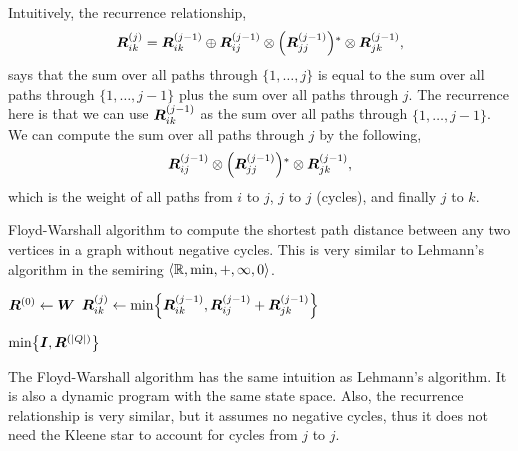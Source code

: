 Intuitively, the recurrence relationship, \[
  \mat{R}_{ik}^{(j)} = \mat{R}_{ik}^{(j-1)} \oplus \mat{R}_{ij}^{(j-1)} \otimes \lft( \mat{R}_{jj}^{(j-1)} \rgt)^* \otimes \mat{R}_{jk}^{(j-1)}
,\]
says that the sum over all paths through $\{ 1,\ldots,j \}$ is equal to the sum
over all paths through $\{ 1,\ldots,j-1 \}$ plus the sum over all paths through
$j$. The recurrence here is that we can use $\bm{R}_{ik}^{(j-1)}$ as the sum
over all paths through $\{ 1,\ldots,j-1 \}$. We can compute the sum over all
paths through $j$ by the following, \[
  \mat{R}_{ij}^{(j-1)} \otimes \lft( \mat{R}_{jj}^{(j-1)} \rgt)^* \otimes \mat{R}_{jk}^{(j-1)}
,\]
which is the weight of all paths from $i$ to $j$, $j$ to $j$ (cycles), and
finally $j$ to $k$.

\begin{algorithm}
  \caption{Floyd-Warshall algorithm to compute the shortest path distance
  between any two vertices in a graph without negative cycles. This is very
  similar to Lehmann's algorithm in the semiring $\langle \mathbb{R}, \min, +, \infty,
  0 \rangle$.}
  \label{alg:floyd-warshall}

  \begin{algorithmic}[1]
      \State $\bm{R}^{(0)} \gets \bm{W}$
            \State $\mat{R}_{ik}^{(j)} \gets \min \lft\{ \mat{R}_{ik}^{(j-1)}, \mat{R}_{ij}^{(j-1)} + \mat{R}_{jk}^{(j-1)} \rgt\}$
          \EndFor
        \EndFor
      \EndFor

      \State \Return $\min \lft\{ \mat{I}, \mat{R}^{(|Q|)} \rgt\}$
    \EndFunction
  \end{algorithmic}
\end{algorithm}

The Floyd-Warshall algorithm \citep{floyd1962algorithm,warshall1962theorem} has
the same intuition as Lehmann's algorithm. It is also a dynamic program with
the same state space. Also, the recurrence relationship is very similar, but it
assumes no negative cycles, thus it does not need the Kleene star to account
for cycles from $j$ to $j$.
